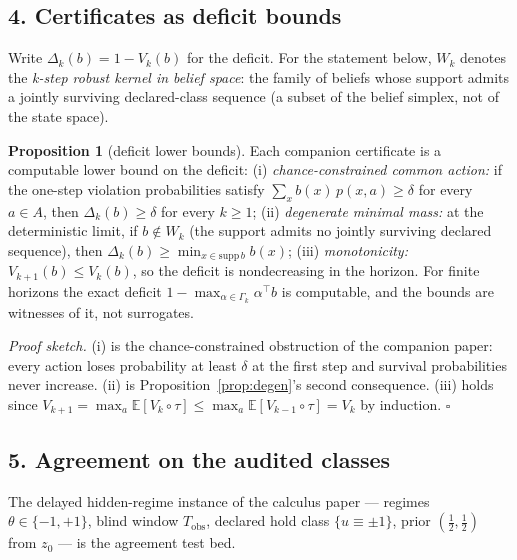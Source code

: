 \documentclass[10pt,twocolumn]{article}
\theoremstyle{definition}
\newtheorem{proposition}{Proposition}
\begin{document}
\subsection{4. Certificates as deficit bounds}\label{deficit}

Write \(\Delta_{k}(b) = 1 - V_{k}(b)\) for the deficit. For the
statement below, \(W_{k}\) denotes the \emph{k-step robust kernel in
belief space}: the family of beliefs whose support admits a jointly
surviving declared-class sequence (a subset of the belief simplex, not of
the state space).

\begin{proposition}[deficit lower bounds]\label{prop:deficit}
Each companion certificate is a computable lower bound on the deficit:
(i) \emph{chance-constrained common action:} if the one-step violation
probabilities satisfy \(\sum_{x} b(x)\, p(x, a) \ge \delta\) for every
\(a \in A\), then \(\Delta_{k}(b) \ge \delta\) for every \(k \ge 1\);
(ii) \emph{degenerate minimal mass:} at the deterministic limit, if
\(b \notin W_{k}\) (the support admits no jointly surviving declared
sequence), then \(\Delta_{k}(b) \ge \min_{x \in \mathrm{supp}\, b} b(x)\);
(iii) \emph{monotonicity:} \(V_{k+1}(b) \le V_{k}(b)\), so the deficit is
nondecreasing in the horizon. For finite horizons the exact deficit
\(1 - \max_{\alpha \in \Gamma_{k}} \alpha^{\top} b\) is computable, and
the bounds are witnesses of it, not surrogates.
\end{proposition}

\emph{Proof sketch.} (i) is the chance-constrained obstruction of the
companion paper: every action loses probability at least \(\delta\) at the
first step and survival probabilities never increase. (ii) is
Proposition~\ref{prop:degen}'s second consequence. (iii) holds since
\(V_{k+1} = \max_a \mathbb{E}[V_{k} \circ \tau] \le \max_a \mathbb{E}
[V_{k-1} \circ \tau] = V_{k}\) by induction.
\hfill\(\square\)

\subsection{5. Agreement on the audited classes}\label{agreement}

The delayed hidden-regime instance of the calculus paper --- regimes
\(\theta \in \{-1, +1\}\), blind window \(T_{\mathrm{obs}}\), declared hold
class \(\{u \equiv \pm 1\}\), prior \((\tfrac12, \tfrac12)\) from
\(z_{0}\) --- is the agreement test bed.
\end{document}
